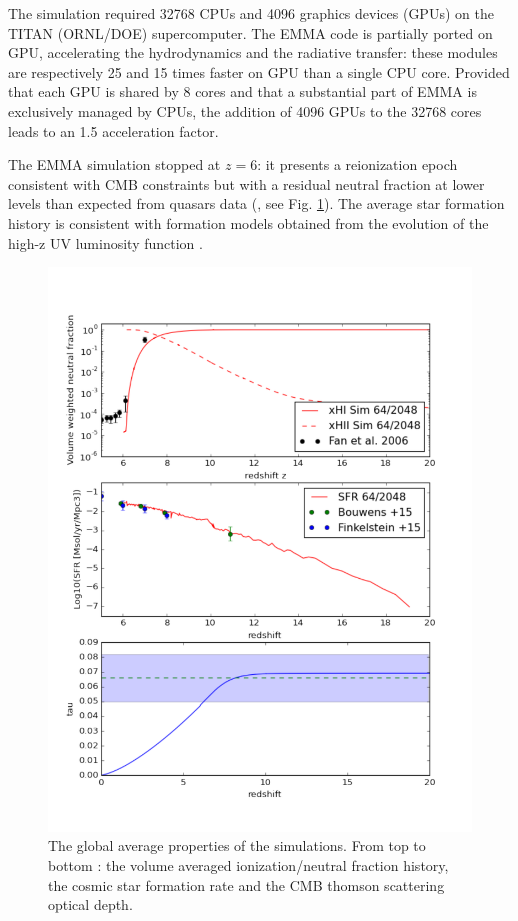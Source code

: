 \documentclass[twocolumn]{aastex61}
\begin{document}
The simulation required 32768 CPUs and 4096 graphics devices (GPUs) on the TITAN (ORNL/DOE) supercomputer. The EMMA code is partially ported on GPU, accelerating the hydrodynamics and the radiative transfer: these modules are respectively 25 and 15 times faster on GPU than a single CPU core. Provided that each GPU is shared by 8 cores and that a substantial part of EMMA is exclusively managed by CPUs, the addition of 4096 GPUs to the 32768 cores leads to an 1.5 acceleration factor. 


The EMMA simulation stopped at $z=6$: it presents a reionization epoch consistent with CMB constraints \citep{PLA15} but with a residual neutral fraction at lower levels than expected from quasars data (\citet{FAN6}, see Fig. \ref{fig:globpro}). The average star formation history is consistent with formation models obtained from the evolution of the high-z UV luminosity function \citep{BOU14,FIN15}.  

\begin{figure}[ht!]
\includegraphics[height=1.10\columnwidth, width=0.94\columnwidth]{img/x_sfr_tau.pdf}
\caption{The global average properties of the simulations. From top to bottom : the volume averaged ionization/neutral fraction history, the cosmic star formation rate and the CMB thomson scattering optical depth.}
\label{fig:globpro}
\end{figure}
\end{document}
